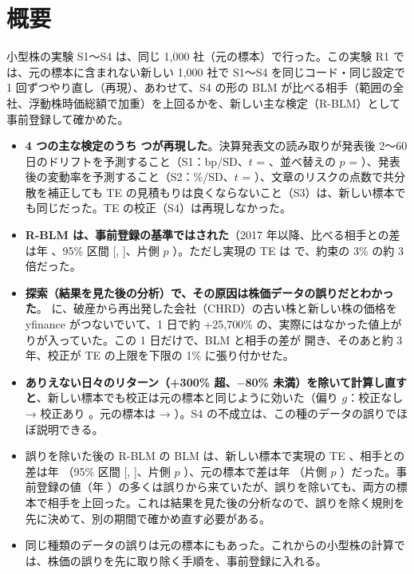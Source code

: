 \chapter*{概要}

小型株の実験 S1〜S4 は、同じ 1,000 社（元の標本）で行った。この実験 R1 では、元の標本に含まれない新しい 1,000 社で S1〜S4 を同じコード・同じ設定で 1 回ずつやり直し（再現）、あわせて、S4 の形の BLM が比べる相手（範囲の全社、浮動株時価総額で加重）を上回るかを、新しい主な検定（R-BLM）として事前登録して確かめた。

\begin{keybox}[要点]
\begin{itemize}
\item \textbf{4 つの主な検定のうち  つが再現した}。決算発表文の読み取りが発表後 2〜60 日のドリフトを予測すること（S1：bp/SD、$t$ = 、並べ替えの $p$ = ）、発表後の変動率を予測すること（S2：\%/SD、$t$ = ）、文章のリスクの点数で共分散を補正しても TE の見積もりは良くならないこと（S3）は、新しい標本でも同じだった。TE の校正（S4）は再現しなかった。
\item \textbf{R-BLM は、事前登録の基準ではされた}（2017 年以降、比べる相手との差は年 、95\% 区間 [, ]、片側 $p$ ）。ただし実現の TE は  で、約束の 3\% の約 3 倍だった。
\item \textbf{探索（結果を見た後の分析）で、その原因は株価データの誤りだとわかった}。 に、破産から再出発した会社（CHRD）の古い株と新しい株の価格を yfinance がつないでいて、1 日で約 +25{,}700\% の、実際にはなかった値上がりが入っていた。この 1 日だけで、BLM と相手の差が  開き、そのあと約 3 年、校正が TE の上限を下限の 1\% に張り付かせた。
\item \textbf{ありえない日々のリターン（+300\% 超、$-$80\% 未満）を除いて計算し直すと}、新しい標本でも校正は元の標本と同じように効いた（偏り $g$：校正なし  → 校正あり 。元の標本は  → ）。S4 の不成立は、この種のデータの誤りでほぼ説明できる。
\item 誤りを除いた後の R-BLM の BLM は、新しい標本で実現の TE 、相手との差は年 （95\% 区間 [, ]、片側 $p$ ）、元の標本で差は年 （片側 $p$ ）だった。事前登録の値（年 ）の多くは誤りから来ていたが、誤りを除いても、両方の標本で相手を上回った。これは結果を見た後の分析なので、誤りを除く規則を先に決めて、別の期間で確かめ直す必要がある。
\item 同じ種類のデータの誤りは元の標本にもあった。これからの小型株の計算では、株価の誤りを先に取り除く手順を、事前登録に入れる。
\end{itemize}
\end{keybox}
